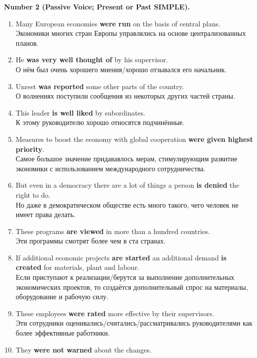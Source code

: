 \documentclass[main.tex]{subfiles}
\begin{document}
\textbf{Number 2 (Passive Voice; Present or Past SIMPLE).}

\begin{enumerate}[nosep]
	\item Many European economies \textbf{were run} on the basis of central plans.\\
	Экономики многих стран Европы управлялись на основе централизованных планов.
	\item He \textbf{was very well thought of} by his supervisor.\\
	О нём был очень хорошего мнения/хорошо отзывался его начальник.
	\item Unrest \textbf{was reported} some other parts of the country.\\
	О волнениях поступили сообщения из некоторых других частей страны.
	\item This leader \textbf{is well liked} by subordinates.\\
	К этому руководителю хорошо относятся подчинённые.
	\item Measures to boost the economy with global cooperation \textbf{were given highest priority}.\\
	Самое большое значение придававлось мерам, стимулирующим развитие экономики с использованием международного сотрудничества.
	\item But even in a democracy there are a lot of things a person \textbf{is denied} the right to do.\\
	Но даже в демократическом обществе есть много такого, чего человек не имеет права делать.
	\item These programs \textbf{are viewed} in more than a hundred countries.\\
	Эти программы смотрят более чем в ста странах.
	\item If additional economic projects \textbf{are started} an additional demand \textbf{is created} for materials, plant and labour.\\
	Если приступают к реализации/берутся за выполнение дополнительных экономических проектов, то создаётся дополнительный спрос на материалы, оборудование и рабочую силу.
	\item These employees \textbf{were rated} more effective by their supervisors.\\
	Эти сотрудники оценивались/считались/рассматривались руководителями как более эффективные работники.
	\item They \textbf{were not warned} about the changes.\\

\end{enumerate}
\end{document}
